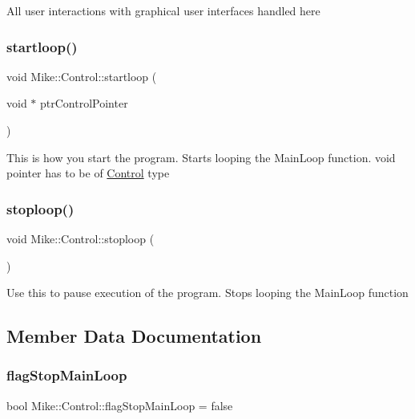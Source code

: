All user interactions with graphical user interfaces handled here \mbox{\label{class_mike_1_1_control_ae34c60ef30c2de2332df13b644c7791f}} 
\subsubsection{\texorpdfstring{startloop()}{startloop()}}
{\footnotesize\ttfamily void Mike\+::\+Control\+::startloop (\begin{DoxyParamCaption}\item[{void $\ast$}]{ptr\+Control\+Pointer }\end{DoxyParamCaption})\hspace{0.3cm}{\ttfamily [static]}}

This is how you start the program. Starts looping the Main\+Loop function. void pointer has to be of \hyperlink{class_mike_1_1_control}{Control} type \mbox{\label{class_mike_1_1_control_aa26389eedd6e1c60fa64fe7883ce6ce8}} 
\subsubsection{\texorpdfstring{stoploop()}{stoploop()}}
{\footnotesize\ttfamily void Mike\+::\+Control\+::stoploop (\begin{DoxyParamCaption}{ }\end{DoxyParamCaption})}

Use this to pause execution of the program. Stops looping the Main\+Loop function 

\subsection{Member Data Documentation}
\mbox{\label{class_mike_1_1_control_a800d1dc7b58dc3af7c081225009c898f}} 
\subsubsection{\texorpdfstring{flag\+Stop\+Main\+Loop}{flagStopMainLoop}}
{\footnotesize\ttfamily bool Mike\+::\+Control\+::flag\+Stop\+Main\+Loop = false\hspace{0.3cm}{\ttfamily [private]}}

